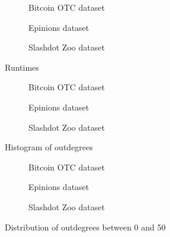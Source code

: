 \begin{figure}[t]
    \centering
        \begin{subfigure}[t]{0.30\textwidth}
        \caption{Bitcoin OTC dataset}
    \end{subfigure}
    \hfill
        \begin{subfigure}[t]{0.30\textwidth}
        \caption{Epinions dataset}
    \end{subfigure}
    \hfill
    \begin{subfigure}[t]{0.30\textwidth}
    	\centering
    	\caption{Slashdot Zoo dataset}
    \end{subfigure}
    \caption{Runtimes}
    \label{fig:datasets_runtimes}
\end{figure}

\begin{figure}[t]
    \centering
        \begin{subfigure}[t]{0.30\textwidth}
        \caption{Bitcoin OTC dataset}
        \label{subfig:bitcoinotc_outdegrees}
    \end{subfigure}
    \hfill
        \begin{subfigure}[t]{0.30\textwidth}
        \caption{Epinions dataset}
        \label{subfig:epinions_outdegrees}
    \end{subfigure}
    \hfill
    \begin{subfigure}[t]{0.30\textwidth}
    	\centering
    	\caption{Slashdot Zoo dataset}
	\label{subfig:slashdot_outdegrees}
    \end{subfigure}
    \caption{Histogram of outdegrees}
    \label{fig:datasets_outdegree_distr}
\end{figure}

\begin{figure}[t]
    \centering
        \begin{subfigure}[t]{0.30\textwidth}
        \caption{Bitcoin OTC dataset}
    \end{subfigure}
    \hfill
        \begin{subfigure}[t]{0.30\textwidth}
        \caption{Epinions dataset}
    \end{subfigure}
    \hfill
    \begin{subfigure}[t]{0.30\textwidth}
    	\centering
    	\caption{Slashdot Zoo dataset}
    \end{subfigure}
    \caption{Distribution of outdegrees between 0 and 50}
    \label{fig:datasets_outdegree_distr_50}
\end{figure}

